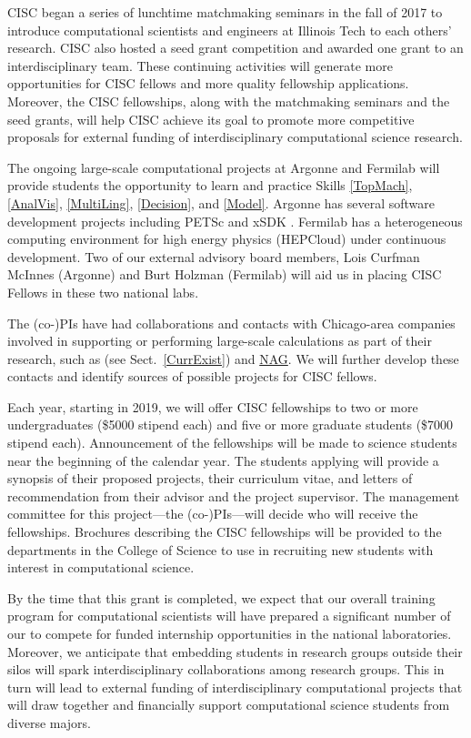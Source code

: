\documentclass[11pt]{NSFamsart}
\begin{document}
CISC began a series of lunchtime matchmaking seminars in the fall of 2017 to introduce computational scientists and engineers at Illinois Tech to each others' research.  CISC also hosted a seed grant competition and awarded one grant to an interdisciplinary team.  These continuing activities will generate more opportunities for CISC fellows and more quality fellowship applications.  Moreover, the CISC fellowships, along with the matchmaking seminars and the seed grants, will help CISC achieve its goal to promote more competitive proposals for external funding of interdisciplinary computational science research. 

The ongoing large-scale computational projects at Argonne and Fermilab will provide students the opportunity to learn and practice Skills \ref{TopMach}, \ref{AnalVis}, \ref{MultiLing}, \ref{Decision}, and \ref{Model}.  Argonne has several software development projects including PETSc \cite{petsc-web-page17} and xSDK \cite{XSDK17a}. Fermilab has a heterogeneous computing environment for high energy physics (HEPCloud) \cite{HEP18a} under continuous development.  Two of our external advisory board members, Lois Curfman McInnes (Argonne) and Burt Holzman (Fermilab) will aid us in placing CISC Fellows in these two national labs.

The (co-)PIs have had collaborations and contacts with Chicago-area companies involved in supporting or performing large-scale calculations as part of their research, such as \HAVI (see Sect.~\ref{CurrExist}) and \href{https://www.nag.com}{NAG}.  We will further develop these contacts and identify sources of possible projects for CISC fellows.

Each year, starting in 2019, we will offer CISC fellowships to two or more undergraduates (\$5000 stipend each) and five or more graduate students (\$7000 stipend each).  Announcement of the fellowships will be made to science students near the beginning of the calendar year.  The students applying will provide a synopsis of their proposed projects, their curriculum vitae, and letters of recommendation from their advisor and the project supervisor.  The management committee for this project---the (co-)PIs---will decide who will receive the fellowships.  Brochures describing the CISC fellowships will be provided to the departments in the College of Science to use in recruiting new students with interest in computational science.

By the time that this grant is completed, we expect that our overall training program for computational scientists will have prepared a significant number of our to compete for funded internship opportunities in the national laboratories.  Moreover, we anticipate that embedding  students in research groups outside their silos will spark interdisciplinary collaborations among research groups.  This in turn will lead to external funding of interdisciplinary computational projects that will draw together and financially support computational science students from diverse majors.
\end{document}
